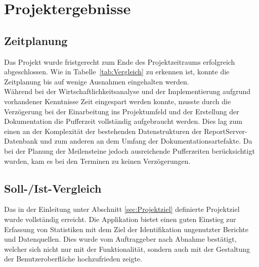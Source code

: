 \section{Projektergebnisse}\label{sec:Projektergebnisse}

\subsection{Zeitplanung}\label{sec:Zeitplanung}
Das Projekt wurde fristgerecht zum Ende des Projektzeitraums erfolgreich abgeschlossen. Wie in Tabelle~\ref{tab:Vergleich} zu erkennen ist, konnte die Zeitplanung bis auf wenige Ausnahmen eingehalten werden.
\\
Während bei der Wirtschaftlichkeitsanalyse und der Implementierung aufgrund vorhandener Kenntnisse Zeit eingespart werden konnte, musste durch die Verzögerung bei der Einarbeitung ins Projektumfeld und der Erstellung der Dokumentation die Pufferzeit vollständig aufgebraucht werden. Dies lag zum einen an der Komplexität der bestehenden Datenstrukturen der ReportServer-Datenbank und zum anderen an dem Umfang der Dokumentationsartefakte. Da bei der Planung der Meilensteine jedoch ausreichende Pufferzeiten berücksichtigt wurden, kam es bei den Terminen zu keinen Verzögerungen.

\subsection{Soll-/Ist-Vergleich}\label{sec:SollIstVergleich}
Das in der Einleitung unter Abschnitt \ref{sec:Projektziel} definierte Projektziel wurde vollständig erreicht. Die Applikation bietet einen guten Einstieg zur Erfassung von Statistiken mit dem Ziel der Identifikation ungenutzter Berichte und Datenquellen. Dies wurde vom Auftraggeber nach Abnahme bestätigt, welcher sich nicht nur mit der Funktionalität, sondern auch mit der Gestaltung der Benutzeroberfläche hochzufrieden zeigte.

